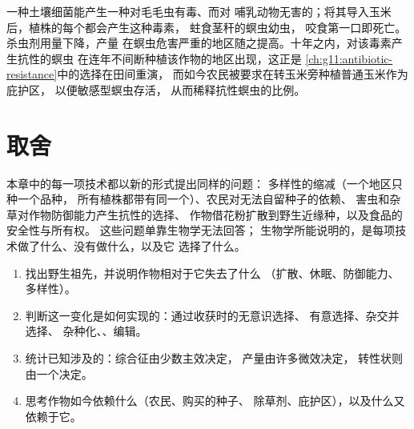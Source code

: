 \begin{example}[玉米中的毒素基因]\label{ex:g12:domesticated-plants:bt}
一种土壤细菌能产生一种对毛毛虫有毒、而对
哺乳动物无害的；将其导入玉米后，植株的每个都会产生这种毒素，
蛀食茎秆的螟虫幼虫，
咬食第一口即死亡。杀虫剂用量下降，产量
在螟虫危害严重的地区随之提高。十年之内，对该毒素产生抗性的螟虫
在连年不间断种植该作物的地区出现，这正是
\cref{ch:g11:antibiotic-resistance}中的选择在田间重演，
而如今农民被要求在转玉米旁种植普通玉米作为庇护区，
以便敏感型螟虫存活，
从而稀释抗性螟虫的比例。
\end{example}

\section{取舍}

\begin{proposition}[利害所在]\label{prop:g12:domesticated-plants:stakes}
本章中的每一项技术都以新的形式提出同样的问题：
多样性的缩减（一个地区只种一个品种，
所有植株都带有同一个）、农民对无法自留种子的依赖、
害虫和杂草对作物防御能力产生抗性的选择、
作物借花粉扩散到野生近缘种，以及食品的安全性与所有权。
这些问题单靠生物学无法回答；
生物学所能说明的，是每项技术做了什么、没有做什么，以及它
选择了什么。
\end{proposition}
\admitted

\begin{method}[解读作物的历史]\label{met:g12:domesticated-plants:read}
\begin{enumerate}
  \item 找出野生祖先，并说明作物相对于它失去了什么
        （扩散、休眠、防御能力、多样性）。
  \item 判断这一变化是如何实现的：通过收获时的无意识选择、
        有意选择、杂交并选择、
        杂种化、、编辑。
  \item 统计已知涉及的：综合征由少数主效决定，
        产量由许多微效决定，
        转性状则由一个决定。
  \item 思考作物如今依赖什么（农民、购买的种子、
        除草剂、庇护区），以及什么又依赖于它。
\end{enumerate}
\end{method}

